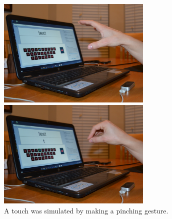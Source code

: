 \begin{figure}[h]
	\centering
	\begin{minipage}[t]{5.8in}
		\begin{minipage}[t]{2.85in}
			\includegraphics[width=2.9in]{Figures/fig_pinch_hover}
		\end{minipage}
		\begin{minipage}[t]{2.9in}
			\includegraphics[width=2.9in]{Figures/fig_pinch_touch}
		\end{minipage}
	\end{minipage}
	\caption[Leap Pinch-air Word Separation]{A touch was simulated by making a pinching gesture.}
	\label{pinch_press_comparison}
\end{figure}